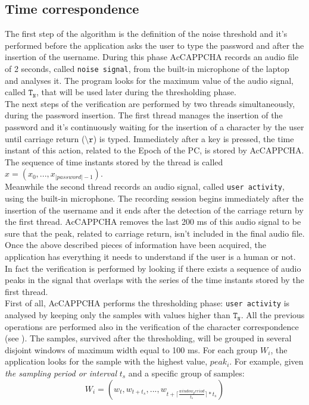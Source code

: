 \subsection{Time correspondence}\label{AcCAPPCHA:time_correspondence}
The first step of the algorithm is the definition of the noise threshold and it's performed before the application asks the user to type the password and after the insertion of the username. During this phase AcCAPPCHA records an audio file of 2 seconds, called \texttt{noise signal}, from the built-in microphone of the laptop and analyses it. The program looks for the maximum value of the audio signal, called $\mathtt{T_N}$, that will be used later during the thresholding phase.\\
The next steps of the verification are performed by two threads simultaneously, during the password insertion. The first thread manages the insertion of the password and it's continuously waiting for the insertion of a character by the user until carriage return ($\mathtt{\setminus r}$) is typed. Immediately after a key is pressed, the time instant of this action, related to the Epoch of the PC, is stored by AcCAPPCHA. The sequence of time instants stored by the thread is called $x=(x_0, ..., x_{|password|-1})$.\\
Meanwhile the second thread records an audio signal, called \texttt{user activity}, using the built-in microphone. The recording session begins immediately after the insertion of the username and it ends after the detection of the carriage return by the first thread. AcCAPPCHA removes the last 200 ms of this audio signal to be sure that the peak, related to carriage return, isn't included in the final audio file.\\
Once the above described pieces of information have been acquired, the application has everything it needs to understand if the user is a human or not. In fact the verification is performed by looking if there exists a sequence of audio peaks in the signal that overlaps with the series of the time instants stored by the first thread.\\
First of all, AcCAPPCHA performs the thresholding phase: \texttt{user activity} is analysed by keeping only the samples with values higher than $\mathtt{T_N}$. All the previous operations are performed also in the verification of the character correspondence (see ). The samples, survived after the thresholding, will be grouped in several disjoint windows of maximum width equal to 100 ms. For each group $W_i$, the application looks for the sample with the highest value, $peak_i$. For example, given \textit{the sampling period or interval} $t_s$ and a specific group of samples: $$W_i = (w_t, w_{t+t_s}, ..., w_{t+\lceil \frac{window_period}{t_s}\rceil * t_s})$$
